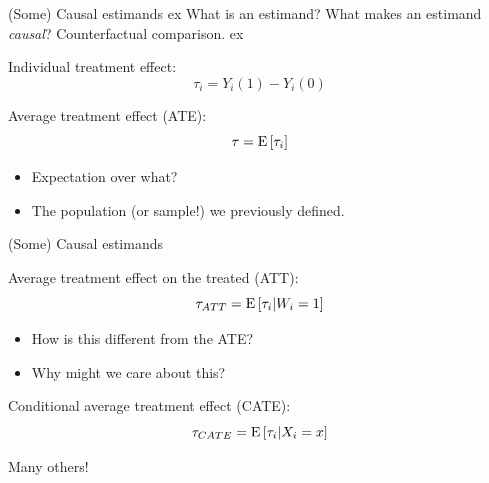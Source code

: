 \documentclass[xcolor={dvipsnames}, handout]{beamer}
\begin{document}

\begin{frame}{(Some) Causal estimands}
 ex
\pause
What is an estimand? \pause What makes an estimand \textit{causal}? \pause Counterfactual comparison.  
 ex
\pause
\begin{wideitemize}
\item Individual treatment effect: \[\tau_i = Y_i(1) - Y_i(0)\]\pause
\item Average treatment effect (ATE): \[\tau = {\textrm E}\,[\tau_i]\] \pause 
\begin{itemize}
\item Expectation over what?\pause
\item[$\rightarrow$] The population (or sample!) we previously defined.
\end{itemize}
\end{wideitemize}

\end{frame}



\begin{frame}{(Some) Causal estimands}

\begin{wideitemize}
\item Average treatment effect on the treated (ATT): \[\tau_{ATT} = {\textrm E}\,[\tau_i | W_i = 1]\] \pause
\begin{itemize}
\item How is this different from the ATE?
\item Why might we care about this?
\end{itemize}\pause
\item Conditional average treatment effect (CATE): \[\tau_{CATE} = {\textrm E}\,[\tau_i | X_i = x]\] \pause
\end{wideitemize}

\centering
Many others!

\end{frame}
\end{document}
